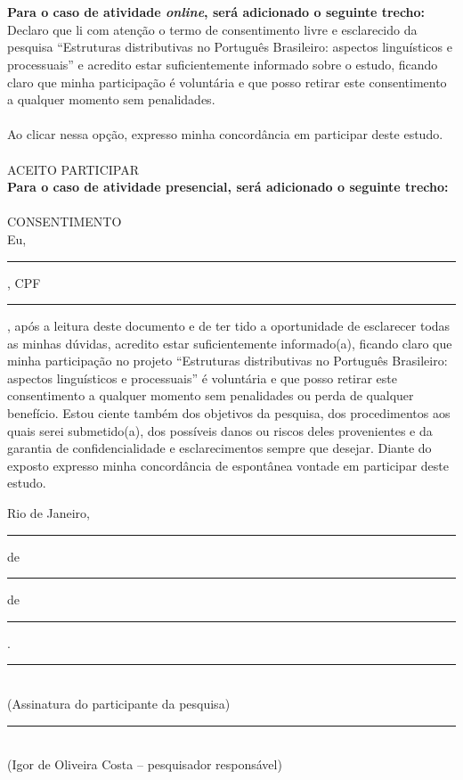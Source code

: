 \\
\\
\noindent \textbf{Para o caso de atividade \emph{online}, será adicionado o seguinte trecho:}\\
Declaro que li com atenção o termo de consentimento livre e esclarecido da pesquisa ``Estruturas distributivas no Português Brasileiro: aspectos linguísticos e processuais'' e acredito estar suficientemente informado sobre o estudo, ficando claro que minha participação é voluntária e que posso retirar este consentimento a qualquer momento sem penalidades.
\\
\\
Ao clicar nessa opção, expresso minha concordância em participar deste estudo.
\\
\\
ACEITO PARTICIPAR
\\
\noindent \textbf{Para o caso de atividade presencial, será adicionado o seguinte trecho:}\\
\\
\noindent CONSENTIMENTO\\
Eu, \rule[-1mm]{8cm}{0.3mm}, CPF \rule[-1mm]{5cm}{0.3mm}, após a leitura deste documento e de ter tido a oportunidade de esclarecer todas as minhas dúvidas, acredito estar suficientemente informado(a), ficando claro que minha participação no projeto ``Estruturas distributivas no Português Brasileiro: aspectos linguísticos e processuais'' é voluntária e que posso retirar este consentimento a qualquer momento sem penalidades ou perda de qualquer benefício. Estou ciente também dos objetivos da pesquisa, dos procedimentos aos quais serei submetido(a), dos possíveis danos ou riscos deles provenientes e da garantia de confidencialidade e esclarecimentos sempre que desejar.
Diante do exposto expresso minha concordância de espontânea vontade em participar deste estudo.

\begin{center}
  Rio de Janeiro, \rule[-1mm]{1cm}{0.3mm} de \rule[-1mm]{3cm}{0.3mm} de \rule[-1mm]{1.5cm}{0.3mm}.\\
  \vspace{1cm}
  \rule[-1mm]{8cm}{0.3mm}\\
  (Assinatura do participante da pesquisa)\\
  \vspace{1cm}
  \rule[-1mm]{8cm}{0.3mm}\\
  (Igor de Oliveira Costa -- pesquisador responsável)
\end{center}

